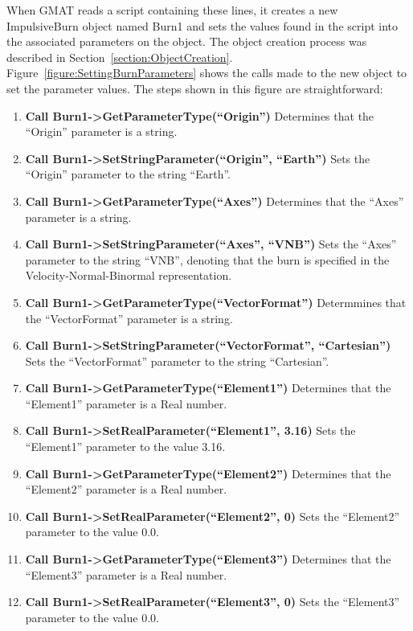When GMAT reads a script containing these lines, it creates a new ImpulsiveBurn object named Burn1
and sets the values found in the script into the associated parameters on the object.  The object
creation process was described in Section~\ref{section:ObjectCreation}. 
Figure~\ref{figure:SettingBurnParameters} shows the calls made to the new object to set the
parameter values.  The steps shown in this figure are straightforward:

\begin{enumerate}
\item \textbf{Call Burn1->GetParameterType(``Origin'')} Determines that the ``Origin'' parameter
is a string.
\item \textbf{Call Burn1->SetStringParameter(``Origin'', ``Earth'')} Sets the ``Origin''
parameter to the string ``Earth''.
\item \textbf{Call Burn1->GetParameterType(``Axes'')} Determines that the ``Axes'' parameter
is a string.
\item \textbf{Call Burn1->SetStringParameter(``Axes'', ``VNB'')} Sets the ``Axes''
parameter to the string ``VNB'', denoting that the burn is specified in the
Velocity-Normal-Binormal representation.
\item \textbf{Call Burn1->GetParameterType(``VectorFormat'')} Determmines that the ``VectorFormat''
parameter is a string.
\item \textbf{Call Burn1->SetStringParameter(``VectorFormat'', ``Cartesian'')} Sets the
``VectorFormat'' parameter to the string ``Cartesian''.
\item \textbf{Call Burn1->GetParameterType(``Element1'')} Determines that the ``Element1'' parameter
is a Real number.
\item \textbf{Call Burn1->SetRealParameter(``Element1'', 3.16)} Sets the ``Element1''
parameter to the value 3.16.
\item \textbf{Call Burn1->GetParameterType(``Element2'')} Determines that the ``Element2'' parameter
is a Real number.
\item \textbf{Call Burn1->SetRealParameter(``Element2'', 0)} Sets the ``Element2''
parameter to the value 0.0.
\item \textbf{Call Burn1->GetParameterType(``Element3'')} Determines that the ``Element3'' parameter
is a Real number.
\item \textbf{Call Burn1->SetRealParameter(``Element3'', 0)} Sets the ``Element3''
parameter to the value 0.0.
\end{enumerate}

